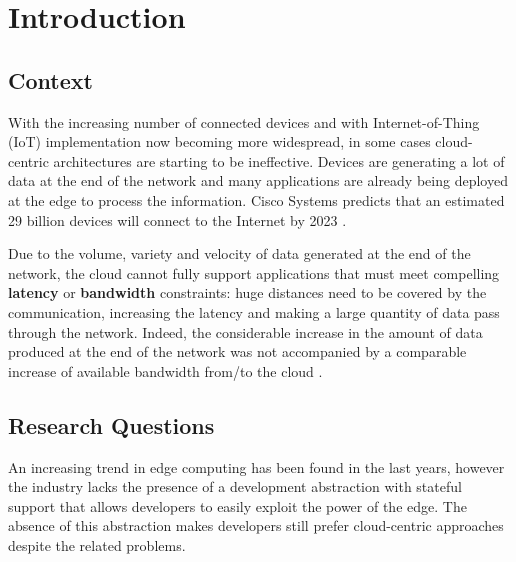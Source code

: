 \chapter{Introduction}

\section{Context}


With the increasing number of connected devices and with Internet-of-Thing (IoT) implementation now becoming more widespread, in some cases cloud-centric architectures are starting to be ineffective. Devices are generating a lot of data at the end of the network and many applications are already being deployed at the edge to process the information.
Cisco Systems predicts that an estimated 29 billion devices will connect to the Internet by 2023 \cite{cisco2018-2023}.

Due to the volume, variety and velocity of data generated at the end of the network, the cloud cannot fully support applications that must meet compelling \textbf{latency} or \textbf{bandwidth} constraints: huge distances need to be covered by the communication, increasing the latency and making a large quantity of data pass through the network.
Indeed, the considerable increase in the amount of data produced at the end of the network was not accompanied by a comparable increase of available bandwidth from/to the cloud \cite{promise-of-edge-computing}.



\section{Research Questions}
An increasing trend in edge computing has been found in the last years, however the industry lacks the presence of a development abstraction with stateful support that allows developers to easily exploit the power of the edge. The absence of this abstraction makes developers still prefer cloud-centric approaches despite the related problems.

